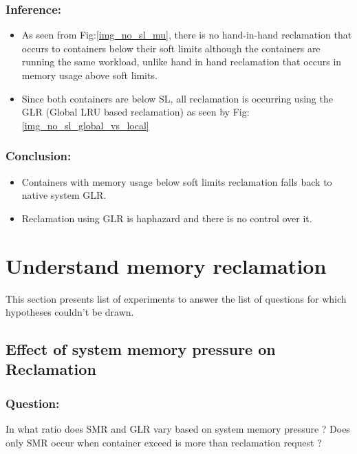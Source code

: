       \subsubsection{Inference:}
	\begin{itemize}
	  \item As seen from Fig:\ref{img_no_sl_mu}, there is no hand-in-hand reclamation that occurs to containers below their soft 
limits although the containers are running the same workload, unlike hand in hand reclamation that occurs in memory usage above soft limits.
	  \item Since both containers are below SL, all reclamation is occurring using the GLR (Global LRU based reclamation) as seen by 
Fig:\ref{img_no_sl_global_vs_local}
	\end{itemize}

      \subsubsection{Conclusion:}
	\begin{itemize}
	  \item Containers with memory usage below soft limits reclamation falls back to native system GLR.
	  \item Reclamation using GLR is haphazard and there is no control over it. 
	\end{itemize}

  
  \section{Understand memory reclamation}
  
    This section presents list of experiments to answer the list of questions for which hypotheses couldn't be drawn. 
  
    \subsection{Effect of system memory pressure on Reclamation}
    
	\subsubsection{Question:} 
	   In what ratio does SMR and GLR vary based on system memory pressure ? Does only SMR occur when container exceed is more than 
reclamation request ?
	
